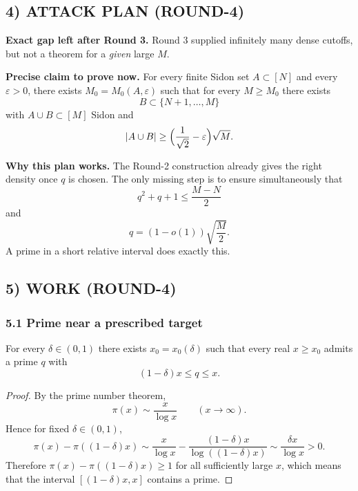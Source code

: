 \subsection*{4) ATTACK PLAN (ROUND-4)}
\textbf{Exact gap left after Round 3.}
Round 3 supplied infinitely many dense cutoffs, but not a theorem for a \emph{given} large $M$.

\textbf{Precise claim to prove now.}
For every finite Sidon set $A\subset [N]$ and every $\varepsilon>0$, there exists $M_0=M_0(A,\varepsilon)$ such that for every $M\ge M_0$ there exists
\[
B\subset \{N+1,\dots,M\}
\]
with $A\cup B\subset [M]$ Sidon and
\[
|A\cup B|\ge \Bigl(\frac1{\sqrt2}-\varepsilon\Bigr)\sqrt M.
\]

\textbf{Why this plan works.}
The Round-2 construction already gives the right density once $q$ is chosen.  The only missing step is to ensure simultaneously that
\[
q^2+q+1\le \frac{M-N}{2}
\]
and
\[
q=(1-o(1))\sqrt{\frac M2}.
\]
A prime in a short relative interval does exactly this.

\subsection*{5) WORK (ROUND-4)}
\subsubsection*{5.1\; Prime near a prescribed target}
\begin{lemma}
\label{lem:prime-near-target}
For every $\delta\in(0,1)$ there exists $x_0=x_0(\delta)$ such that every real $x\ge x_0$ admits a prime $q$ with
\[
(1-\delta)x\le q\le x.
\]
\end{lemma}
\begin{proof}
By the prime number theorem,
\[
\pi(x)\sim \frac{x}{\log x}
\qquad (x\to\infty).
\]
Hence for fixed $\delta\in(0,1)$,
\[
\pi(x)-\pi((1-\delta)x)
\sim \frac{x}{\log x}-\frac{(1-\delta)x}{\log((1-\delta)x)}
\sim \frac{\delta x}{\log x}>0.
\]
Therefore $\pi(x)-\pi((1-\delta)x)\ge 1$ for all sufficiently large $x$, which means that the interval $[(1-\delta)x,x]$ contains a prime.
\end{proof}

